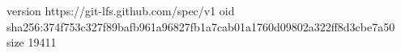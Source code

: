 version https://git-lfs.github.com/spec/v1
oid sha256:374f753c327f89bafb961a96827fb1a7cab01a1760d09802a322ff8d3cbe7a50
size 19411
